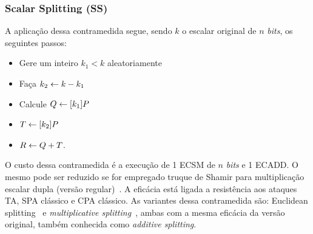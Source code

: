 \subsubsection{Scalar Splitting (SS)~\cite{ClavierJoye2001}}
A aplicação dessa contramedida segue, sendo $k$ o escalar original de $n$ \textit{bits}, os seguintes passos:
\begin{itemize}
    \item Gere um inteiro $k_1 < k$ aleatoriamente
    \item Faça $k_2\leftarrow k - k_1$
    \item Calcule $Q\leftarrow [k_1]P$
    \item $T\leftarrow[k_2]P$ 
    \item $R\leftarrow Q + T$. 
\end{itemize}

O custo dessa contramedida é a execução de 1 ECSM de $n$ \textit{bits} e 1 ECADD. O mesmo pode ser reduzido se for empregado truque de Shamir para multiplicação escalar dupla (versão regular)~\cite{CietJoye2003}. A eficácia está ligada a resistência aos ataques TA, SPA clássico e CPA clássico. As variantes dessa contramedida são: Euclidean splitting~\cite{CietJoye2003} e \textit{multiplicative splitting}~\cite{TrichinaBelleza2003}, ambas com a mesma eficácia da versão original, também conhecida como \textit{additive splitting}.

